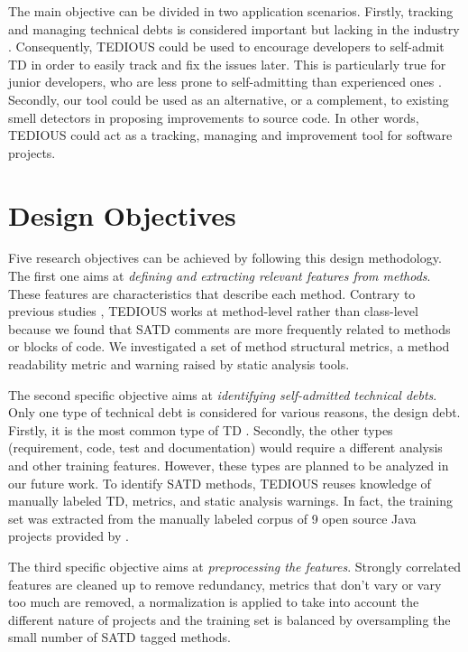 The main objective can be divided in two application scenarios. Firstly, tracking and managing technical debts is considered important but lacking in the industry \citep{Ernst:2015:MMI:2786805.2786848}. Consequently, \ac{TEDIOUS} could be used to encourage developers to self-admit \ac{TD} in order to easily track and fix the issues later. This is particularly true for junior developers, who are less prone to self-admitting than experienced ones \citep{PotdarS14}. Secondly, our tool could be used as an alternative, or a complement, to existing smell detectors in proposing improvements to source code. In other words, \ac{TEDIOUS} could act as a tracking, managing and improvement tool for software projects. \par

\section{Design Objectives} 

Five research objectives can be achieved by following this design methodology. The first one aims at \emph{defining and extracting relevant features from methods}. These features are characteristics that describe each method. Contrary to previous studies \citep{BavotaR16}, \ac{TEDIOUS} works at method-level rather than class-level because we found that \ac{SATD} comments are more frequently related to methods or blocks of code. We investigated a set of method structural metrics, a method readability metric and warning raised by static analysis tools. \par

The second specific objective aims at \emph{identifying self-admitted technical debts}. Only one type of technical debt is considered for various reasons, the design debt. Firstly, it is the most common type of \ac{TD} \citep{MaldonadoNLP}. Secondly, the other types (requirement, code, test and documentation) would require a different analysis and other training features. However, these types are planned to be analyzed in our future work. To identify SATD methods, TEDIOUS reuses knowledge of manually labeled TD, metrics, and static analysis warnings. In fact, the training set was extracted from the manually labeled corpus of 9 open source Java projects provided by \citet{MaldonadoNLP}.

The third specific objective aims at \emph{preprocessing the features}. Strongly correlated features are cleaned up to remove redundancy, metrics that don't vary or vary too much are removed, a normalization is applied to take into account the different nature of projects and the training set is balanced by oversampling the small number of \ac{SATD} tagged methods. \par

